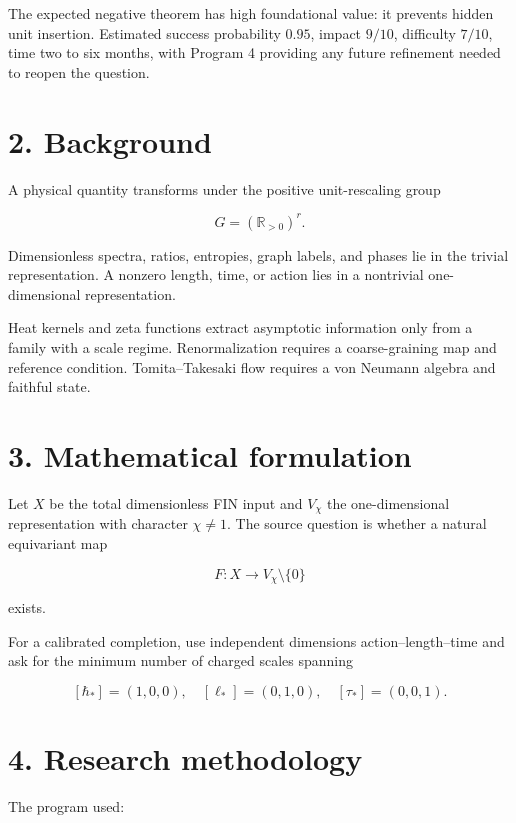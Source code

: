 \documentclass[11pt,a4paper,openany]{report}
\begin{document}
The expected negative theorem has high foundational value: it prevents hidden unit insertion. Estimated success probability \(0.95\), impact \(9/10\), difficulty \(7/10\), time two to six months, with Program 4 providing any future refinement needed to reopen the question.

\section{2. Background}

A physical quantity transforms under the positive unit-rescaling group

\[
G=(\mathbb R_{>0})^r.
\]

Dimensionless spectra, ratios, entropies, graph labels, and phases lie in the trivial representation. A nonzero length, time, or action lies in a nontrivial one-dimensional representation.

Heat kernels and zeta functions extract asymptotic information only from a family with a scale regime. Renormalization requires a coarse-graining map and reference condition. Tomita–Takesaki flow requires a von Neumann algebra and faithful state.

\section{3. Mathematical formulation}

Let \(X\) be the total dimensionless FIN input and \(V_\chi\) the one-dimensional representation with character \(\chi\ne1\). The source question is whether a natural equivariant map

\[
F:X\longrightarrow V_\chi\setminus\{0\}
\]

exists.

For a calibrated completion, use independent dimensions action–length–time and ask for the minimum number of charged scales spanning

\[
[\hbar_*]=(1,0,0),\quad
[\ell_*]=(0,1,0),\quad
[\tau_*]=(0,0,1).
\]

\section{4. Research methodology}

The program used:
\end{document}
